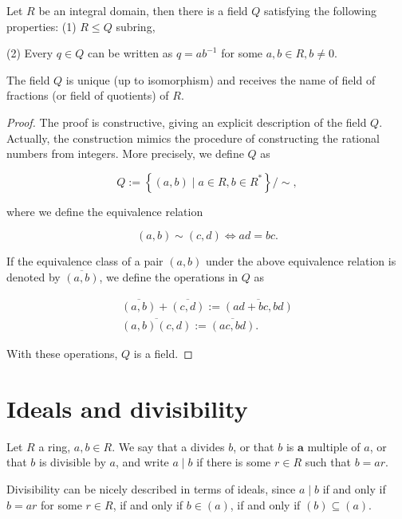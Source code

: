 \begin{theorem}
     Let $R$ be an integral domain, then there is a field $Q$ satisfying the following properties: (1) $R \leq Q$ subring,

    (2) Every $q \in Q$ can be written as $q=a b^{-1}$ for some $a, b \in R, b \neq 0$.
    
    The field $Q$ is unique (up to isomorphism) and receives the name of field of fractions (or field of quotients) of $R$.
\end{theorem} 
\begin{proof}
    The proof is constructive, giving an explicit description of the field $Q$. Actually, the construction mimics the procedure of constructing the rational numbers from integers. More precisely, we define $Q$ as

    $$
    Q:=\left\{(a, b) \mid a \in R, b \in R^{*}\right\} / \sim,
    $$
    
    where we define the equivalence relation
    
    $$
    (a, b) \sim(c, d) \Longleftrightarrow a d=b c .
    $$
    
    If the equivalence class of a pair $(a, b)$ under the above equivalence relation is denoted by $\overline{(a, b)}$, we define the operations in $Q$ as
    
    $$
    \begin{array}{r}
    \overline{(a, b)}+\overline{(c, d)}:=\overline{(a d+b c, b d)} \\
    \overline{(a, b)(c, d)}:=\overline{(a c, b d)} .
    \end{array}
    $$
    
    With these operations, $Q$ is a field.
\end{proof} 

\section{Ideals and divisibility}
\begin{definition}[Divisibility]
     Let $R$ a ring, $a, b \in R$. We say that a divides $b$, or that $b$ is $\boldsymbol{a}$ multiple of $a$, or that $b$ is divisible by $a$, and write $a \mid b$ if there is some $r \in R$ such that $b=a r$.
\end{definition}
Divisibility can be nicely described in terms of ideals, since $a \mid b$ if and only if $b=a r$ for some $r \in R$, if and only if $b \in(a)$, if and only if $(b) \subseteq(a)$.

